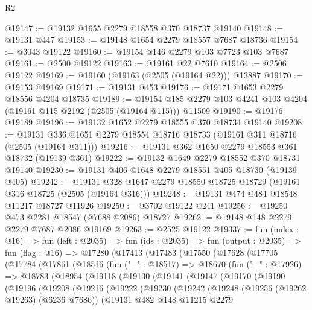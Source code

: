 \begin{lexlean}{R2}
\begin{coremodule}
@19147 := @19132 @1655 @2279 @18558 @370 @18737 @19140
@19148 := @19131 @447
@19153 := @19148 @1654 @2279 @18557 @7687 @18736
@19154 := @3043 @19122
@19160 := @19154 @146 @2279 @103 @7723 @103 @7687
@19161 := @2500 @19122
@19163 := @19161 @22 @7610
@19164 := @2506 @19122
@19169 := @19160 (@19163 (@2505 (@19164 @22))) @13887
@19170 := @19153 @19169
@19171 := @19131 @453
@19176 := @19171 @1653 @2279 @18556 @4204 @18735
@19189 := @19154 @185 @2279 @103 @4241 @103 @4204 (@19161 @115 @2192 (@2505 (@19164 @115))) @11509
@19190 := @19176 @19189
@19196 := @19132 @1652 @2279 @18555 @370 @18734 @19140
@19208 := @19131 @336 @1651 @2279 @18554 @18716 @18733 (@19161 @311 @18716 (@2505 (@19164 @311)))
@19216 := @19131 @362 @1650 @2279 @18553 @361 @18732 (@19139 @361)
@19222 := @19132 @1649 @2279 @18552 @370 @18731 @19140
@19230 := @19131 @406 @1648 @2279 @18551 @405 @18730 (@19139 @405)
@19242 := @19131 @328 @1647 @2279 @18550 @18725 @18729 (@19161 @316 @18725 (@2505 (@19164 @316)))
@19248 := @19131 @474 @484 @18548 @11217 @18727 @11926
@19250 := @3702 @19122 @241
@19256 := @19250 @473 @2281 @18547 (@7688 @2086) @18727
@19262 := @19148 @148 @2279 @2279 @7687 @2086 @19169
@19263 := @2525 @19122
@19337 := fun (index : @16) =>
  fun (left : @2035) =>
  fun (ids : @2035) =>
  fun (output : @2035) =>
  fun (flag : @16) =>
  @17280
    (@17413
      (@17483
        (@17550
          (@17628
            (@17705
              (@17784
                (@17861
                  (@18516
                    (fun ("_" : @18517) =>
                    @18670
                      (fun ("_" : @17926) =>
                      @18783
                        (@18954
                          (@19118
                            (@19130
                              (@19141
                                (@19147
                                  (@19170
                                    (@19190
                                      (@19196
                                        (@19208
                                          (@19216
                                            (@19222
                                              (@19230
                                                (@19242
                                                  (@19248
                                                    (@19256 (@19262 @19263) (@6236 @7686))
                                                    (@19131
                                                      @482
                                                      @148
                                                      @11215
                                                      @2279

\end{coremodule}
\end{lexlean}
